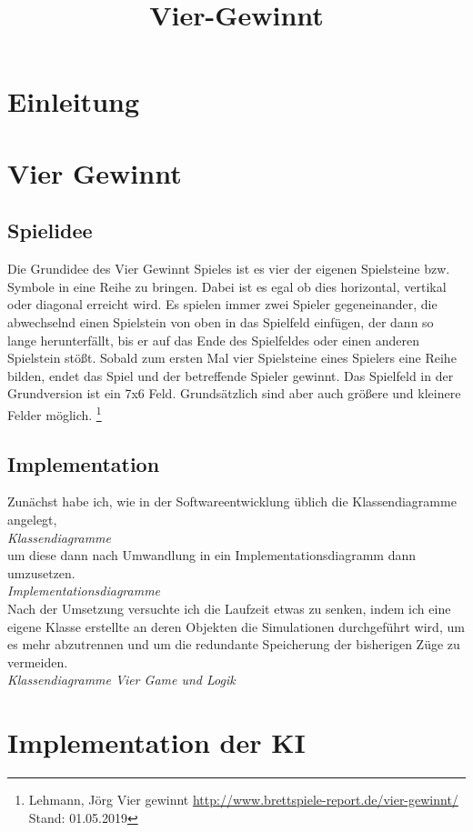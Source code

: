 \documentclass[12pt,a4paper,ngerman]{article}
\title{Vier-Gewinnt}
\author{}
\begin{document}
	\maketitle
	\newpage
	\tableofcontents
	\newpage
	\section{Einleitung}
	
	\section{Vier Gewinnt}
	\subsection{Spielidee}
	Die Grundidee des \glqq Vier Gewinnt\grqq{} Spieles ist es vier der eigenen Spielsteine bzw. Symbole in eine Reihe zu bringen.
	Dabei ist es egal ob dies horizontal, vertikal oder diagonal erreicht wird.
	Es spielen immer zwei Spieler gegeneinander, die abwechselnd einen Spielstein von oben in das Spielfeld einfügen, der dann so lange herunterfällt, bis er auf das Ende des Spielfeldes oder einen anderen Spielstein stößt.
	Sobald zum ersten Mal vier Spielsteine eines Spielers eine Reihe bilden, endet das Spiel und der betreffende Spieler gewinnt.
	Das Spielfeld in der Grundversion ist ein 7x6 Feld. Grundsätzlich sind aber auch größere und kleinere Felder möglich.
	\footnote{Lehmann, Jörg \glqq Vier gewinnt\grqq{} \url{http://www.brettspiele-report.de/vier-gewinnt/} Stand: 01.05.2019}
	\subsection{Implementation}
	Zunächst habe ich, wie in der Softwareentwicklung üblich die Klassendiagramme angelegt,\\
	\textit{Klassendiagramme}\\
	 um diese dann nach Umwandlung in ein Implementationsdiagramm dann umzusetzen.\\
	\textit{Implementationsdiagramme}\\
	Nach der Umsetzung versuchte ich die Laufzeit etwas zu senken, indem ich eine eigene Klasse erstellte an deren Objekten die Simulationen durchgeführt wird, um es mehr abzutrennen und um die redundante Speicherung der bisherigen Züge zu vermeiden.\\
	\textit{Klassendiagramme Vier Game und Logik}
	\section{Implementation der KI}
\end{document}
